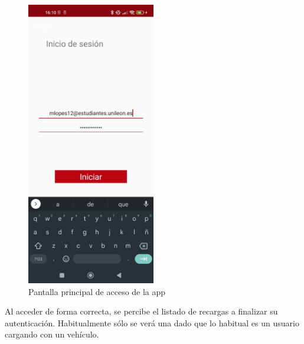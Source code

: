 \documentclass[12pt,a4paper,onecolumn,oneside]{report}
\begin{document}
\begin{figure}[H] 
\centering
  \includegraphics[width=0.5\textwidth]{figuras/design6.png}
  \caption[Pantalla principal de acceso de la app]{Pantalla principal de acceso de la app\\
  }
  \label{fig:design6}
\end{figure}

Al acceder de forma correcta, se percibe el listado de recargas a finalizar su autenticación. Habitualmente sólo se verá una dado que lo habitual es un usuario cargando con un vehículo.
\end{document}
